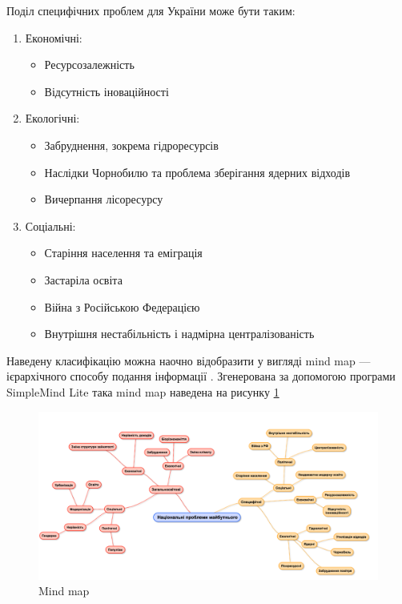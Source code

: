         Поділ специфічних проблем для України може бути таким:

        \begin{enumerate}
            \item Економічні:
            \begin{itemize}
                \item Ресурсозалежність
                \item Відсутність іноваційності
            \end{itemize}

            \item Екологічні:
            \begin{itemize}
                \item Забруднення, зокрема гідроресурсів
                \item Наслідки Чорнобилю та проблема зберігання ядерних відходів
                \item Вичерпання лісоресурсу
            \end{itemize}

            \item Соціальні:
            \begin{itemize}
                \item Старіння населення та еміграція
                \item Застаріла освіта
                \item Війна з Російською Федерацією
                \item Внутрішня нестабільність і надмірна централізованість
            \end{itemize}
        \end{enumerate}

        Наведену класифікацію можна наочно відобразити у вигляді mind map --- ієрархічного
        способу подання інформації \cite{hopper2015practicing}. Згенерована за
        допомогою програми SimpleMind Lite така mind map наведена на рисунку \ref{fig:mindmap}

        \begin{figure}[!htp]
            \centering
            \includegraphics[scale = 0.5]{PNG/mindmap.png}
            \caption{Mind map}
            \label{fig:mindmap}
        \end{figure}


